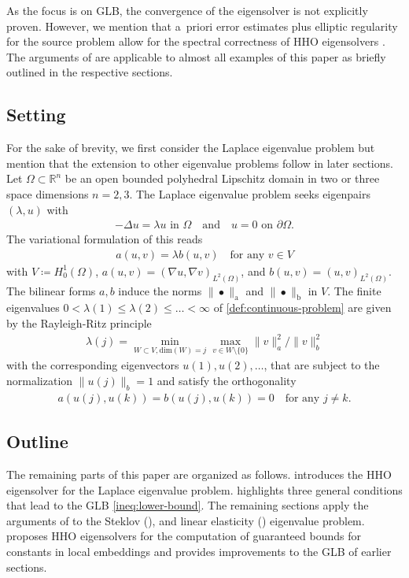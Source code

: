 \documentclass[a4paper]{amsart}
\numberwithin{equation}{section}
\theoremstyle{remark}
\theoremstyle{definition}
\theoremstyle{assumptionnoperiod}
\begin{document}
As the focus is on GLB, the convergence of the eigensolver is not explicitly proven. However, we mention that a~priori error estimates plus elliptic regularity for the source problem allow for the spectral correctness of HHO eigensolvers \cite{CaloCicuttinDengErn2019}. The arguments of \cite{CaloCicuttinDengErn2019} are applicable to almost all examples of this paper as briefly outlined in the respective sections.

\subsection{Setting}\label{sec:abstract-setting}
For the sake of brevity, we first consider the Laplace eigenvalue problem but mention that the extension to other eigenvalue problems follow in later sections.
Let $\Omega \subset \mathbb{R}^n$ be an open bounded polyhedral Lipschitz domain in two or three space dimensions $n = 2,3$.
The Laplace eigenvalue problem seeks eigenpairs $(\lambda,u)$ with
\begin{align}\label{def:Laplace}
	-\Delta u = \lambda u \text{ in } \Omega \quad\text{and}\quad u = 0 \text{ on } \partial \Omega.
\end{align}
The variational formulation of this reads
\begin{align}\label{def:continuous-problem}
	a(u,v) = \lambda b(u,v) \quad\text{for any } v \in V
\end{align}
with $V \coloneqq H^1_0(\Omega)$, $a(u,v) = (\nabla u, \nabla v)_{L^2(\Omega)}$, and $b(u,v) = (u,v)_{L^2(\Omega)}$.
The bilinear forms $a, b$ induce the norms $\|\bullet\|_\mathrm{a}$ and $\|\bullet\|_\mathrm{b}$ in $V$.
The finite eigenvalues $0 < \lambda(1) \leq \lambda(2) \leq \dots < \infty$ of \eqref{def:continuous-problem} are given by the Rayleigh-Ritz principle
\begin{align}
	\lambda(j) = \min_{W \subset V, \mathrm{dim}(W) = j} \max_{v \in W\setminus\{0\}} \|v\|_a^2/\|v\|_b^2
\end{align}
with
the corresponding eigenvectors $u(1), u(2), \dots$, that are subject to the normalization $\|u(j)\|_b = 1$ and satisfy the orthogonality
\begin{align}\label{def:a-orthogonality}
	a(u(j), u(k)) = b(u(j), u(k)) = 0 \quad\text{for any } j \neq k.
\end{align}

\subsection{Outline} The remaining parts of this paper are organized as follows. 
 introduces the HHO eigensolver for the Laplace eigenvalue problem.
 highlights three general conditions that lead to the GLB \eqref{ineq:lower-bound}.
The remaining sections apply the arguments of  to the Steklov (),
and linear elasticity () eigenvalue problem.
 proposes HHO eigensolvers for the computation of guaranteed bounds for constants in local embeddings and provides improvements to the GLB of earlier sections.
\end{document}
